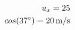 \documentclass[preview]{standalone}
\begin{document}
\begin{align*}
\special{dvisvgm:raw <g id='unique000'>}u_x = 25\\cos(37^{\circ}) = 20\,\mathrm{m/s}\special{dvisvgm:raw </g>}
\end{align*}
\end{document}
